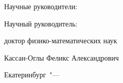 %
\vspace{0pt plus4fill} %
\begin{flushright}
\ifdefined\supervisorTwoFio
Научные руководители:

\supervisorRegalia

\ifdefined\supervisorDead
\framebox{\supervisorFio}
\else
\supervisorFio
\fi

\supervisorTwoRegalia

\ifdefined\supervisorTwoDead
\framebox{\supervisorTwoFio}
\else
\supervisorTwoFio
\fi
\else
Научный руководитель:

доктор физико-математических наук

\ifdefined\supervisorDead
\framebox{\supervisorFio}
\else
Кассан-Оглы Феликс Александрович
\fi
\fi

\end{flushright}
%
\vspace{0pt plus4fill} %
{\centering Екатеринбург\ "--- \thesisYear\par}
